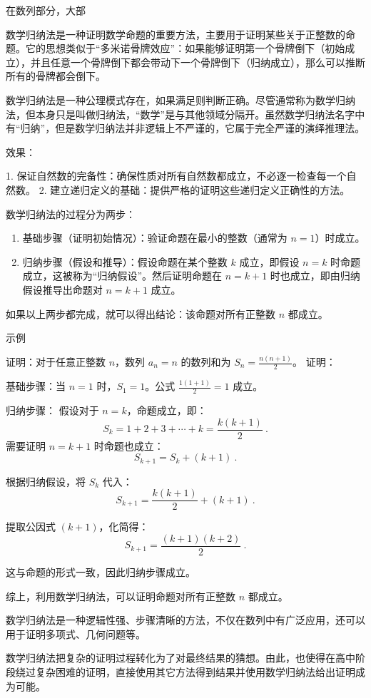 
\begin{issues}
\issueDraft
\end{issues}


在数列部分，大部

数学归纳法是一种证明数学命题的重要方法，主要用于证明某些关于正整数的命题。它的思想类似于“多米诺骨牌效应”：如果能够证明第一个骨牌倒下（初始成立），并且任意一个骨牌倒下都会带动下一个骨牌倒下（归纳成立），那么可以推断所有的骨牌都会倒下。


数学归纳法是一种公理模式存在，如果满足则判断正确。尽管通常称为数学归纳法，但本身只是叫做归纳法，“数学”是与其他领域分隔开。虽然数学归纳法名字中有“归纳”，但是数学归纳法并非逻辑上不严谨的，它属于完全严谨的演绎推理法。

效果：

1.	保证自然数的完备性：确保性质对所有自然数都成立，不必逐一检查每一个自然数。
2.	建立递归定义的基础：提供严格的证明这些递归定义正确性的方法。

数学归纳法的过程分为两步：
\begin{enumerate}
\item 基础步骤（证明初始情况）：验证命题在最小的整数（通常为 $n = 1$）时成立。
\item 归纳步骤（假设和推导）：假设命题在某个整数 $k$ 成立，即假设 $n = k$ 时命题成立，这被称为“归纳假设”。然后证明命题在 $n = k+1$ 时也成立，即由归纳假设推导出命题对 $n = k+1$ 成立。
\end{enumerate}

如果以上两步都完成，就可以得出结论：该命题对所有正整数 $n$ 都成立。

示例
\begin{example}{证明：对于任意正整数 $n$，数列 $a_n=n$ 的数列和为 $S_n = \frac{n(n+1)}{2}$。}
证明：

基础步骤：当 $n = 1$ 时，$S_1 = 1$。公式 $\frac{1(1+1)}{2} = 1$ 成立。

归纳步骤：
假设对于 $n = k$，命题成立，即：
\begin{equation}
S_k = 1 + 2 + 3 + \cdots + k = \frac{k(k+1)}{2}~.
\end{equation}
需要证明 $n = k+1$ 时命题也成立：
\begin{equation}
S_{k+1} = S_k + (k+1)~.
\end{equation}

根据归纳假设，将 $S_k$ 代入：
\begin{equation}
S_{k+1} = \frac{k(k+1)}{2} + (k+1)~.
\end{equation}

提取公因式 $(k+1)$，化简得：
\begin{equation}
S_{k+1} = \frac{(k+1)(k+2)}{2}~.
\end{equation}

这与命题的形式一致，因此归纳步骤成立。

综上，利用数学归纳法，可以证明命题对所有正整数 $n$ 都成立。
\end{example}

数学归纳法是一种逻辑性强、步骤清晰的方法，不仅在数列中有广泛应用，还可以用于证明多项式、几何问题等。

数学归纳法把复杂的证明过程转化为了对最终结果的猜想。由此，也使得在高中阶段绕过复杂困难的证明，直接使用其它方法得到结果并使用数学归纳法给出证明成为可能。